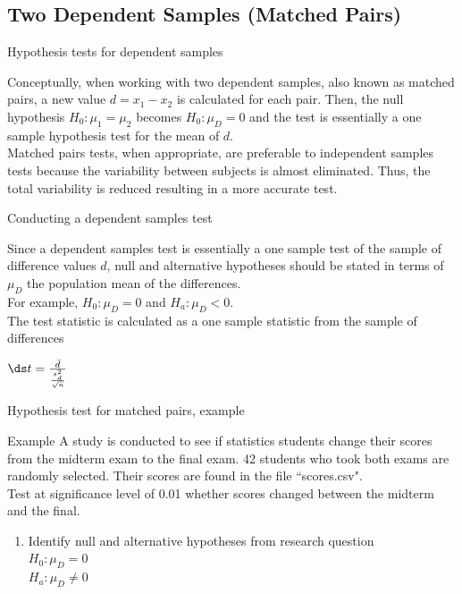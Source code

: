 \documentclass[xcolor=table]{beamer}
\begin{document}
\subsection{Two Dependent Samples (Matched Pairs)}

\begin{frame}{Hypothesis tests for dependent samples}
\begin{block}{}
\large
Conceptually, when working with two dependent samples, also known as matched pairs, a new value $d = x_1 - x_2$ is calculated for each pair. Then, the null hypothesis $H_0: \mu_1 = \mu_2$ becomes $H_0: \mu_D = 0$ and the test is essentially a one sample hypothesis test for the mean of $d$.\\
\pause\medskip
Matched pairs tests, when appropriate, are preferable to independent samples tests because the variability between subjects is almost eliminated. Thus, the total variability is reduced resulting in a more accurate test. 
\end{block}
\end{frame}

\begin{frame}{Conducting a dependent samples test}
\begin{block}{}
\large
Since a dependent samples test is essentially a one sample test of the sample of difference values $d$, null and alternative hypotheses should be stated in terms of $\mu_D$ the population mean of the differences.\\
\pause\medskip
For example, $H_0: \mu_D = 0$ and $H_a: \mu_D < 0$.\\
\pause\medskip
The test statistic is calculated as a one sample statistic from the sample of differences\\
\medskip
{\centering $\ds t = \frac {\bar d}{\frac{s_d^2}{\sqrt{n}}}$ \par}
\medskip
\end{block}
\end{frame}


\begin{frame}{Hypothesis test for matched pairs, example}
\large
\begin{exampleblock}{Example}
A study is conducted to see if statistics students change their scores from the midterm exam to the final exam. 42 students who took both exams are randomly selected. Their scores are found in the file ``scores.csv".\\
\medskip
Test at significance level of 0.01 whether scores changed between the midterm and the final.
\begin{enumerate}
\pause\item Identify null and alternative hypotheses from research question\\
\pause$H_0: \mu_D = 0$\\
$H_a: \mu_D \ne 0$\\
\end{enumerate}
\end{exampleblock}
\end{frame}
\end{document}
